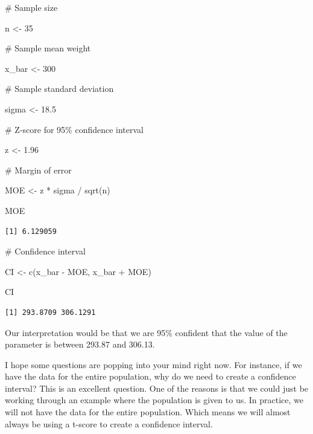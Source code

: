 \documentclass[
  letterpaper,
  DIV=11,
  numbers=noendperiod]{scrreprt}
\newenvironment{Shaded}{\begin{snugshade}}{\end{snugshade}}
\newcommand{\CommentTok}[1]{\textcolor[rgb]{0.37,0.37,0.37}{#1}}
\newcommand{\DecValTok}[1]{\textcolor[rgb]{0.68,0.00,0.00}{#1}}
\newcommand{\FloatTok}[1]{\textcolor[rgb]{0.68,0.00,0.00}{#1}}
\newcommand{\FunctionTok}[1]{\textcolor[rgb]{0.28,0.35,0.67}{#1}}
\newcommand{\NormalTok}[1]{\textcolor[rgb]{0.00,0.23,0.31}{#1}}
\newcommand{\OtherTok}[1]{\textcolor[rgb]{0.00,0.23,0.31}{#1}}
\newcommand{\SpecialCharTok}[1]{\textcolor[rgb]{0.37,0.37,0.37}{#1}}
\begin{document}
\begin{Shaded}
\begin{Highlighting}[]
\CommentTok{\# Sample size}

\NormalTok{n }\OtherTok{\textless{}{-}} \DecValTok{35}

\CommentTok{\# Sample mean weight}

\NormalTok{x\_bar }\OtherTok{\textless{}{-}} \DecValTok{300}

\CommentTok{\# Sample standard deviation}

\NormalTok{sigma }\OtherTok{\textless{}{-}} \FloatTok{18.5}

\CommentTok{\# Z{-}score for 95\% confidence interval}

\NormalTok{z }\OtherTok{\textless{}{-}} \FloatTok{1.96}

\CommentTok{\# Margin of error}

\NormalTok{MOE }\OtherTok{\textless{}{-}}\NormalTok{ z }\SpecialCharTok{*}\NormalTok{ sigma }\SpecialCharTok{/} \FunctionTok{sqrt}\NormalTok{(n)}

\NormalTok{MOE}
\end{Highlighting}
\end{Shaded}

\begin{verbatim}
[1] 6.129059
\end{verbatim}

\begin{Shaded}
\begin{Highlighting}[]
\CommentTok{\# Confidence interval}

\NormalTok{CI }\OtherTok{\textless{}{-}} \FunctionTok{c}\NormalTok{(x\_bar }\SpecialCharTok{{-}}\NormalTok{ MOE, x\_bar }\SpecialCharTok{+}\NormalTok{ MOE)}

\NormalTok{CI}
\end{Highlighting}
\end{Shaded}

\begin{verbatim}
[1] 293.8709 306.1291
\end{verbatim}

Our interpretation would be that we are 95\% confident that the value of
the parameter is between 293.87 and 306.13.

I hope some questions are popping into your mind right now. For
instance, if we have the data for the entire population, why do we need
to create a confidence interval? This is an excellent question. One of
the reasons is that we could just be working through an example where
the population is given to us. In practice, we will not have the data
for the entire population. Which means we will almost always be using a
t-score to create a confidence interval.
\end{document}
